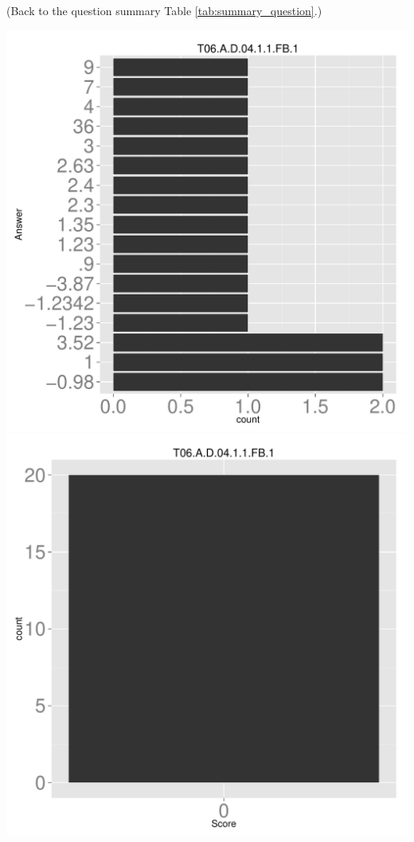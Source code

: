 \documentclass[12pt,nohyper]{tufte-handout}\usepackage[]{graphicx}\usepackage[]{color}
\begin{document}
 (Back to the question summary Table \ref{tab:summary_question}.)

\begin{center} \includegraphics[width=.45\linewidth]{Topic06_13_answer} \includegraphics[width=.45\linewidth]{Topic06_13_score} \end{center} 
\end{document}
